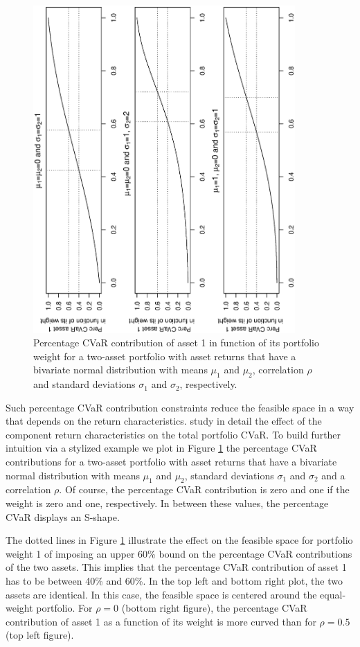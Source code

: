 \documentclass[12pt,a4paper]{article}
\begin{document}
\begin{figure}[tb] \label{fig:sensitivityfixedrho}
\begin{center}
\caption{Percentage CVaR contribution of asset 1 in function of its portfolio weight for a two-asset portfolio with asset returns that have a bivariate normal distribution with means $\mu_1$ and $\mu_2$, correlation $\rho$ and standard deviations $\sigma_1$ and $\sigma_2$, respectively.   }
\includegraphics[width=10cm,angle=270]{sensitivity_rho50.eps}
\end{center}
\end{figure}

Such percentage CVaR contribution constraints reduce the feasible space in a way that depends on the return characteristics. \citet{Stoyanov2009} study in detail the effect of the component return characteristics on the total portfolio CVaR. To build further intuition via a stylized example we plot in Figure \ref{fig:sensitivityfixedrho} the percentage CVaR contributions for a two-asset portfolio with asset returns that have a bivariate normal distribution with means $\mu_1$  and $\mu_2$, standard deviations $\sigma_1$ and $\sigma_2$  and a correlation $\rho$. Of course, the percentage CVaR contribution is zero and one if the weight is zero and one, respectively. In between these values, the percentage CVaR displays an S-shape. 

The dotted lines in Figure \ref{fig:sensitivityfixedrho} illustrate the effect on the feasible space for portfolio weight 1 of imposing an upper 60\% bound on the percentage CVaR contributions of the two assets. This implies that the percentage CVaR contribution of asset 1 has to be between 40\% and 60\%.
In the top left and bottom right plot, the two assets are identical. In this case, the feasible space is centered around the equal-weight portfolio. For $\rho=0$ (bottom right figure), the percentage CVaR contribution of asset 1 as a function of its weight is more curved than for $\rho=0.5$ (top left figure).
\end{document}
